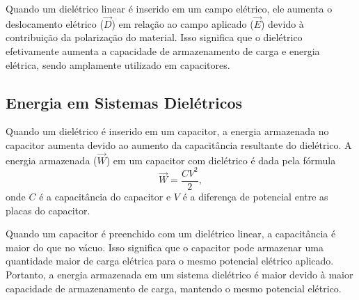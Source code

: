 Quando um dielétrico linear é inserido em um campo elétrico, ele aumenta o deslocamento elétrico ($\vec{D}$) em relação ao campo aplicado ($\vec{E}$) devido à contribuição da polarização do material. Isso significa que o dielétrico efetivamente aumenta a capacidade de armazenamento de carga e energia elétrica, sendo amplamente utilizado em capacitores.

\subsection{ Energia em Sistemas Dielétricos}
Quando um dielétrico é inserido em um capacitor, a energia armazenada no capacitor aumenta devido ao aumento da capacitância resultante do dielétrico. A energia armazenada ($\vec{W}$) em um capacitor com dielétrico é dada pela fórmula
\begin{equation}
   \vec{W} = \frac{CV^2}{2},
\end{equation}
onde $C$ é a capacitância do capacitor e $V$ é a diferença de potencial entre as placas do capacitor.

Quando um capacitor é preenchido com um dielétrico linear, a capacitância é maior do que no vácuo. Isso significa que o capacitor pode armazenar uma quantidade maior de carga elétrica para o mesmo potencial elétrico aplicado. Portanto, a energia armazenada em um sistema dielétrico é maior devido à maior capacidade de armazenamento de carga, mantendo o mesmo potencial elétrico.
\newpage



